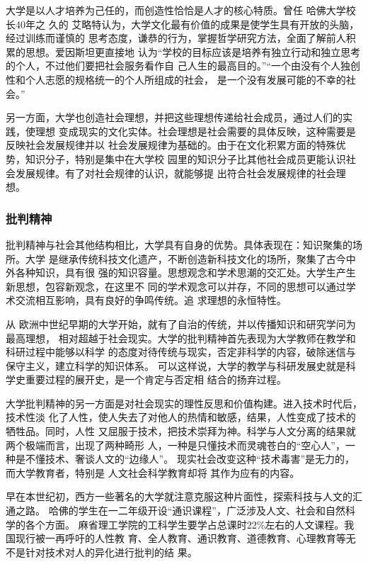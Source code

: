 \documentclass[11pt]{ctexart}
\begin{document}
{{{{大学是以人才培养为己任的，而创造性恰恰是人才的核心特质。曾任 哈佛大学校长40年之
久的 艾略特认为，大学文化最有价值的成果是使学生具有开放的头脑，经过训练而谨慎的
思考态度，谦恭的行为，掌握哲学研究方法，全面了解前人积累的思想。爱因斯坦更直接地
认为“学校的目标应该是培养有独立行动和独立思考的个人，不过他们要把社会服务看作自
己人生的最高目的。”“一个由没有个人独创性和个人志愿的规格统一的个人所组成的社会，
是一个没有发展可能的不幸的社会。”


另一方面，大学也创造社会理想，并把这些理想传递给社会成员，通过人们的实践，使理想
变成现实的文化实体。社会理想是社会需要的具体反映，这种需要是反映社会发展规律并以
社会发展规律为基础的。由于在文化积累方面的特殊优势，知识分子，特别是集中在大学校
园里的知识分子比其他社会成员更能认识社会发展规律。有了对社会规律的认识，就能够提
出符合社会发展规律的社会理想。

\subsubsection{批判精神}
\label{sec:org164faaa}

批判精神与社会其他结构相比，大学具有自身的优势。具体表现在：知识聚集的场所。大学
是继承传统科技文化遗产，不断创造新科技文化的场所，聚集了古今中外各种知识，具有很
强的知识容量。思想观念和学术思潮的交汇处。大学生产生新思想，包容新观念，在这里不
同的学术观念可以并存，不同的思想可以通过学术交流相互影响，具有良好的争鸣传统。追
求理想的永恒特性。


从 欧洲中世纪早期的大学开始，就有了自治的传统，并以传播知识和研究学问为最高理想，
相对超越于社会现实。大学的批判精神首先表现为大学教师在教学和科研过程中能够以科学
的态度对待传统与现实，否定非科学的内容，破除迷信与保守主义，建立科学的知识体系。
可以这样说，大学的教学与科研发展史就是科学史重要过程的展开史，是一个肯定与否定相
结合的扬弃过程。


大学批判精神的另一方面是对社会现实的理性反思和价值构建。进入技术时代后，技术性淡
化了人性，使人失去了对他人的热情和敏感，结果，人性变成了技术的牺牲品。同时，人性
又屈服于技术，把技术崇拜为神。科学与人文分离的结果就两个极端而言，出现了两种畸形
人，一种是只懂技术而灵魂苍白的“空心人”，一种是不懂技术、奢谈人文的“边缘人”。
现实社会改变这种“技术毒害”是无力的，而大学教育者，特别是 人文社会科学教育却将
其作为应有的内容。


早在本世纪初，西方一些著名的大学就注意克服这种片面性，探索科技与人文的汇通之路。
哈佛的学生在一二年级开设“通识课程”，广泛涉及人文、社会和自然科学的各个方面。
麻省理工学院的工科学生要学占总课时22\%左右的人文课程。我国现行被一再呼吁的人性教
育、全人教育、通识教育、道德教育、心理教育等无不是针对技术对人的异化进行批判的结
果。


}}}}
\end{document}

